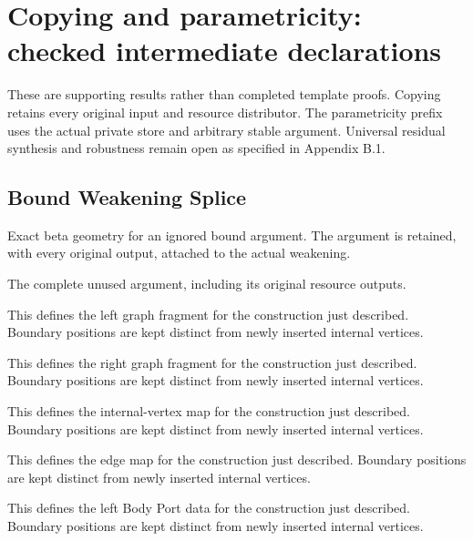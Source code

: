 \clearpage
\section{Copying and parametricity: checked intermediate declarations}
\label{sec:remaining-template-concordance}
These are supporting results rather than completed template proofs. Copying retains every original input and resource distributor. The parametricity prefix uses the actual private store and arbitrary stable argument. Universal residual synthesis and robustness remain open as specified in Appendix B.1.

\subsection{Bound Weakening Splice}
Exact beta geometry for an ignored bound argument. The argument is retained, with every original output, attached to the actual weakening.

The complete unused argument, including its original resource outputs.
\par{}

This defines the left graph fragment for the construction just described. Boundary positions are kept distinct from newly inserted internal vertices.
\par{}

This defines the right graph fragment for the construction just described. Boundary positions are kept distinct from newly inserted internal vertices.
\par{}

This defines the internal-vertex map for the construction just described. Boundary positions are kept distinct from newly inserted internal vertices.
\par{}

This defines the edge map for the construction just described. Boundary positions are kept distinct from newly inserted internal vertices.
\par{}

This defines the left Body Port data for the construction just described. Boundary positions are kept distinct from newly inserted internal vertices.
\par{}

